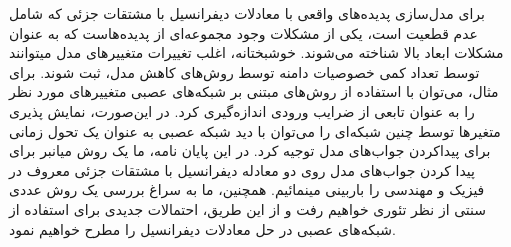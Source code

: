 
برای مدل‌سازی پدیده‌های واقعی با معادلات دیفرانسیل با مشتقات جزئی که شامل عدم قطعیت است، یکی از مشکلات وجود مجموعه‌ای از پدیده‌هاست که به عنوان مشکلات ابعاد بالا شناخته می‌شوند. خوشبختانه، اغلب تغییرات متغییرهای مدل میتوانند توسط تعداد کمی خصوصیات دامنه توسط روش‌های کاهش مدل، ثبت شوند. برای مثال، می‌توان با استفاده از روش‌های مبتنی بر شبکه‌های عصبی متغییرهای مورد نظر را به عنوان تابعی از ضرایب ورودی اندازه‌گیری کرد. در این‌صورت، نمایش پذیری متغیرها توسط چنین شبکه‌ای را می‌توان با دید شبکه عصبی به عنوان یک تحول زمانی برای پیداکردن جواب‌های مدل توجیه کرد. در این پایان نامه، ما یک روش میانبر برای پیدا کردن جواب‌های مدل روی دو معادله دیفرانسیل با مشتقات جزئی معروف در فیزیک و مهندسی را باربینی مینمائیم. همچنین، ما به سراغ بررسی یک روش عددی سنتی از نظر تئوری خواهیم رفت و از این طریق، احتمالات جدیدی برای استفاده از شبکه‌های عصبی در حل معادلات دیفرانسیل را مطرح خواهیم نمود.


